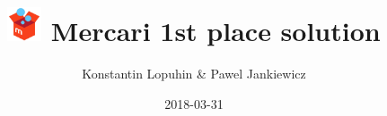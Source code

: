 \documentclass[aspectratio=169]{beamer}
\title{\includegraphics[width=1cm]{img/mercari-logo.jpg} Mercari 1st place solution}
\author{Konstantin Lopuhin \& Pawel Jankiewicz}
\date{2018-03-31}
\begin{document}
 
\frame{\titlepage}








 
\end{document}
